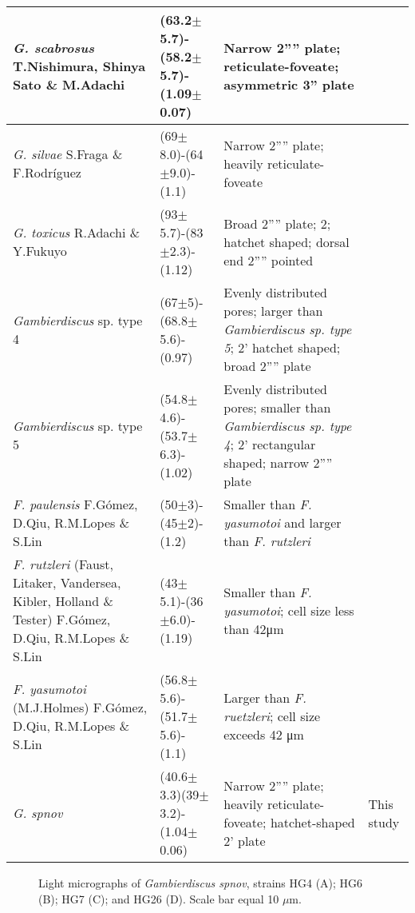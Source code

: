 \documentclass[12pt]{article}
\begin{document}
\begin{longtable}{ | p{5cm} | p{2cm} | p{6cm} | p{2cm} |}
 \hline
\textit{G. scabrosus} T.Nishimura, Shinya Sato \& M.Adachi	& (63.2$\pm$5.7)-(58.2$\pm$5.7)-(1.09$\pm$0.07) & Narrow 2'''' plate; reticulate-foveate; asymmetric 3” plate & \citep{nishimura2014morphology,nishimura2013genetic,kuno2010genetic}  \\
 \hline
 \textit{G. silvae}	S.Fraga \& F.Rodr{\'i}guez & (69$\pm$8.0)-(64$\pm$9.0)-(1.1) & Narrow 2'''' plate; heavily reticulate-foveate & \citep{fraga2014genus,litaker2010global} \\
 \hline
\textit{G. toxicus} R.Adachi \& Y.Fukuyo & (93$\pm$5.7)-(83$\pm$2.3)-(1.12) & Broad 2'''' plate; 2; hatchet shaped; dorsal end 2'''' pointed & \citep{litaker2009taxonomy,adachi1979thecal,chinain1997intraspecific,richlen2008phylogeography}\\
 \hline
 \emph{Gambierdiscus} sp. type 4	& (67$\pm$5)-(68.8$\pm$5.6)-(0.97) & Evenly distributed pores; larger than \textit{Gambierdiscus sp. type 5}; 2’ hatchet shaped; broad 2'''' plate 
 & \citep{xu2014distribution}\\
 \hline
 \emph{Gambierdiscus} sp. type 5 & (54.8$\pm$4.6)-(53.7$\pm$6.3)-(1.02) & Evenly distributed pores; smaller than \textit{Gambierdiscus sp. type 4}; 2’ rectangular shaped; narrow 2'''' plate &  \citep{xu2014distribution} \\
 \hline
 \textit{F. paulensis} F.Gómez, D.Qiu, R.M.Lopes \& S.Lin & (50$\pm$3)-(45$\pm$2)-(1.2) & Smaller than \textit{F. yasumotoi} and larger than \textit{F. rutzleri} & \citep{gomez2015fukuyoa} \\
 \hline
\textit{F. rutzleri }(Faust, Litaker, Vandersea, Kibler, Holland \& Tester) F.Gómez, D.Qiu, R.M.Lopes \& S.Lin& (43$\pm$5.1)-(36$\pm$6.0)-(1.19) & Smaller than \textit{F. yasumotoi}; cell size less than 42μm &  \citep{litaker2009taxonomy}\\
 \hline
\textit{F. yasumotoi }(M.J.Holmes) F.Gómez, D.Qiu, R.M.Lopes \& S.Lin& (56.8$\pm$5.6)-(51.7$\pm$5.6)-(1.1) & Larger than \textit{F. ruetzleri}; cell size exceeds 42 μm & \citep{litaker2009taxonomy,holmes1998gambierdiscus}  \\
 \hline
\textit{G. spnov}  & (40.6$\pm$3.3)(39$\pm$3.2)-(1.04$\pm$0.06) & Narrow 2'''' plate; heavily reticulate-foveate; hatchet-shaped 2' plate & This study\\
   \hline
\end{longtable}
\FloatBarrier

\FloatBarrier 
\begin{figure} 
\caption{Light micrographs of \emph{Gambierdiscus spnov}, strains HG4 (A); HG6 (B); HG7 (C); and HG26 (D). Scale bar equal 10 $\mu$m.​} 
\label{fig:PetLM}
\end{figure} 
\end{document}
